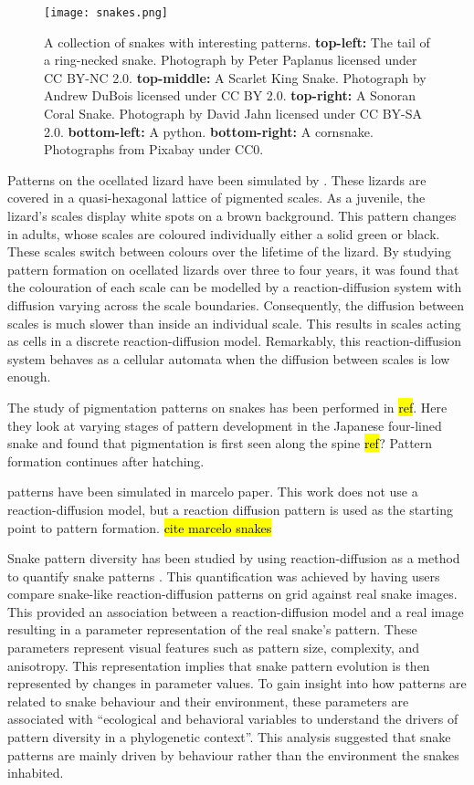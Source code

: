 
\begin{figure}[hb]
	\centering
	\texttt{[image: snakes.png]}
	\caption{A collection of snakes with interesting patterns. \textbf{top-left:} The tail of a ring-necked snake. Photograph by Peter Paplanus licensed under CC BY-NC 2.0. \textbf{top-middle:} A Scarlet King Snake. Photograph by Andrew DuBois licensed under CC BY 2.0. \textbf{top-right:} A Sonoran Coral Snake. Photograph by David Jahn licensed under CC BY-SA 2.0. \textbf{bottom-left:} A python. \textbf{bottom-right:} A cornsnake. Photographs from Pixabay under CC0.}
	\label{fig:realSnakePatterns}
\end{figure}

Patterns on the ocellated lizard have been simulated by \cite{manukyan2017}. These lizards are covered in a quasi-hexagonal lattice of pigmented scales. As a juvenile, the lizard's scales display white spots on a brown background. This pattern changes in adults, whose scales are coloured individually either a solid green or black. These scales switch between colours over the lifetime of the lizard. By studying pattern formation on ocellated lizards over three to four years, it was found that the colouration of each scale can be modelled by a reaction-diffusion system with diffusion varying across the scale boundaries. Consequently, the diffusion between scales is much slower than inside an individual scale. This results in scales acting as cells in a discrete reaction-diffusion model. Remarkably, this reaction-diffusion system behaves as a cellular automata when the diffusion between scales is low enough.

The study of pigmentation patterns on snakes has been performed in \hl{ref}. Here they look at varying stages of pattern development in the Japanese four-lined snake and found that pigmentation is first seen along the spine \hl{ref}? Pattern formation continues after hatching.

patterns have been simulated in marcelo paper. This work does not use a reaction-diffusion model, but a reaction diffusion pattern is used as the starting point to pattern formation. \hl{cite marcelo snakes}

Snake pattern diversity has been studied by using reaction-diffusion as a method to quantify snake patterns \cite{}. This quantification was achieved by having users compare snake-like reaction-diffusion patterns on grid against real snake images. This provided an association between a reaction-diffusion model and a real image resulting in a parameter representation of the real snake’s pattern. These parameters represent visual features such as pattern size, complexity, and anisotropy. This representation implies that snake pattern evolution is then represented by changes in parameter values. To gain insight into how patterns are related to snake behaviour and their environment, these parameters are associated with “ecological and behavioral variables to understand the drivers of pattern diversity in a phylogenetic context”. This analysis suggested that snake patterns are mainly driven by behaviour rather than the environment the snakes inhabited. 

